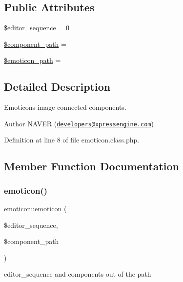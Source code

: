 \subsection*{Public Attributes}
\begin{DoxyCompactItemize}
\item 
\hyperlink{classemoticon_ac9b927beccb93f77b8ef28b363841f38}{\$editor\+\_\+sequence} = 0
\item 
\hyperlink{classemoticon_a6553902e718eb62d7f0e1bab0406c653}{\$component\+\_\+path} = \textquotesingle{}\textquotesingle{}
\item 
\hyperlink{classemoticon_a21bb58c0d640141cc27203b584f99dd8}{\$emoticon\+\_\+path} = \textquotesingle{}\textquotesingle{}
\end{DoxyCompactItemize}


\subsection{Detailed Description}
Emoticons image connected components. 

\begin{DoxyAuthor}{Author}
N\+A\+V\+ER (\href{mailto:developers@xpressengine.com}{\tt developers@xpressengine.\+com}) 
\end{DoxyAuthor}


Definition at line 8 of file emoticon.\+class.\+php.



\subsection{Member Function Documentation}
\hypertarget{classemoticon_a8b042772a4d61cfcbdecbe945102a997}{}\label{classemoticon_a8b042772a4d61cfcbdecbe945102a997} 
\subsubsection{\texorpdfstring{emoticon()}{emoticon()}}
{\footnotesize\ttfamily emoticon\+::emoticon (\begin{DoxyParamCaption}\item[{}]{\$editor\+\_\+sequence,  }\item[{}]{\$component\+\_\+path }\end{DoxyParamCaption})}



editor\+\_\+sequence and components out of the path 



